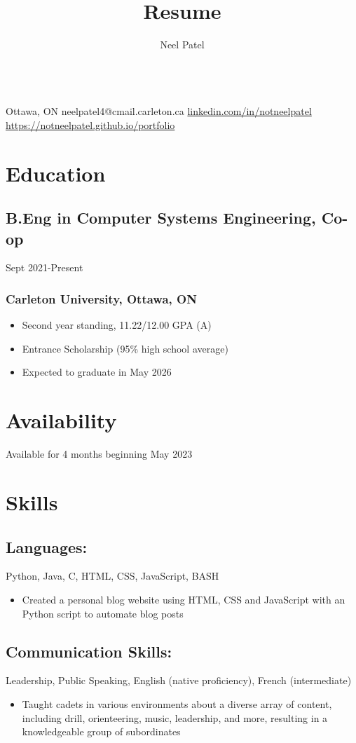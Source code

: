 \documentclass{article}
\makeatletter
\renewcommand{\maketitle}{

\begin{center}
{
\huge\bfseries
\theauthor}
\\
\vspace{0.25em}
Ottawa, ON
\textbar
{ neelpatel4@cmail.carleton.ca}
\textbar
{ \url{linkedin.com/in/notneelpatel}}
\textbar
{ \url{https://notneelpatel.github.io/portfolio}} 
\end{center}
}
\newenvironment{itemlist}
{\begin{itemize}
	\setlength{\itemsep}{0em}
	\setlength{\parskip}{0em}
	\setlength{\parsep}{0em}
}
{\end{itemize}}
\makeatother
\begin{document}
\title{Resume}
\author{Neel Patel}

\maketitle

\section{Education}
\subsection{B.Eng in Computer Systems Engineering, Co-op}\hfill{Sept 2021-Present}
\subsubsection{Carleton University, Ottawa, ON}

\begin{itemlist}
\item Second year standing, 11.22/12.00 GPA (A)
\item Entrance Scholarship (95\% high school average)
\item Expected to graduate in May 2026
\end{itemlist}

\section{Availability}
Available for 4 months beginning May 2023

\section{Skills}
\subsection{Languages: } {Python, Java, C, HTML, CSS, JavaScript, BASH}
\begin{itemlist}
\item Created a personal blog website using HTML, CSS and JavaScript with an Python script to automate blog posts
\end{itemlist}

\subsection{Communication Skills: } {Leadership, Public Speaking, English (native proficiency), French (intermediate)}
\begin{itemlist}
\item Taught cadets in various environments about a diverse array of content, including drill, orienteering, music, leadership, and more, resulting in a knowledgeable group of subordinates 
\end{itemlist}
\end{document}
